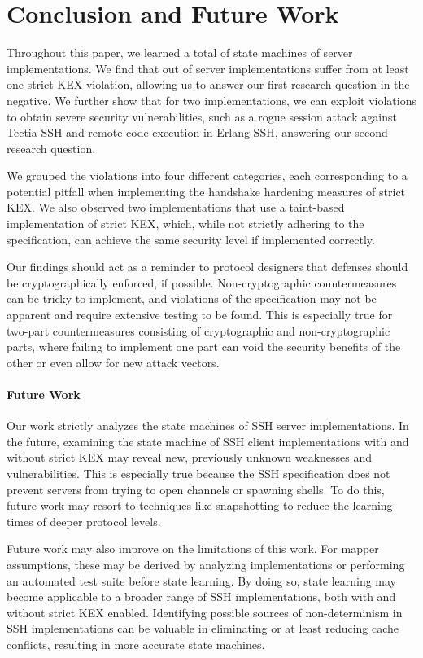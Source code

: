 \section{Conclusion and Future Work}

Throughout this paper, we learned a total of \nrStateMachines state machines of \nrImplementations server implementations. We find that \nrViolatingImplementations out of \nrImplementations server implementations suffer from at least one strict KEX violation, allowing us to answer our first research question in the negative. We further show that for two implementations, we can exploit violations to obtain severe security vulnerabilities, such as a rogue session attack against Tectia SSH and remote code execution in Erlang SSH, answering our second research question.

We grouped the violations into four different categories, each corresponding to a potential pitfall when implementing the handshake hardening measures of strict KEX. We also observed two implementations that use a taint-based implementation of strict KEX, which, while not strictly adhering to the specification, can achieve the same security level if implemented correctly.

Our findings should act as a reminder to protocol designers that defenses should be cryptographically enforced, if possible. Non-cryptographic countermeasures can be tricky to implement, and violations of the specification may not be apparent and require extensive testing to be found. This is especially true for two-part countermeasures consisting of cryptographic and non-cryptographic parts, where failing to implement one part can void the security benefits of the other or even allow for new attack vectors.

\paragraph{Future Work}

Our work strictly analyzes the state machines of SSH server implementations. In the future, examining the state machine of SSH client implementations with and without strict KEX may reveal new, previously unknown weaknesses and vulnerabilities. This is especially true because the SSH specification does not prevent servers from trying to open channels or spawning shells. To do this, future work may resort to techniques like snapshotting to reduce the learning times of deeper protocol levels.

Future work may also improve on the limitations of this work. For mapper assumptions, these may be derived by analyzing implementations or performing an automated test suite before state learning. By doing so, state learning may become applicable to a broader range of SSH implementations, both with and without strict KEX enabled. Identifying possible sources of non-determinism in SSH implementations can be valuable in eliminating or at least reducing cache conflicts, resulting in more accurate state machines.
